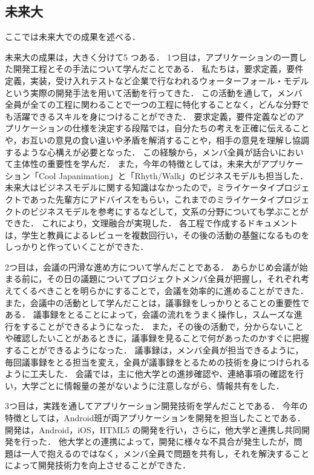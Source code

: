 \subsection{未来大}
\par
ここでは未来大での成果を述べる．
\par
未来大の成果は，大きく分けて5 つある．
1つ目は，アプリケーションの一貫した開発工程とその手法について学んだことである．
私たちは，要求定義，要件定義，実装，受け入れテストなど企業で行なわれるウォーターフォール・モデルという実際の開発手法を用いて活動を行ってきた．
この活動を通して，メンバ全員が全ての工程に関わることで一つの工程に特化することなく，どんな分野でも活躍できるスキルを身につけることができた．
要求定義，要件定義などのアプリケーションの仕様を決定する段階では，自分たちの考えを正確に伝えることや，お互いの意見の食い違いや矛盾を解消することや，相手の意見を理解し協調するような心構えが必要となった．
この経験から，メンバ全員が話合いにおいて主体性の重要性を学んだ．
また，今年の特徴としては，未来大がアプリケーション「Cool Japanimation」と「Rhyth/Walk」のビジネスモデルも担当した．
未来大はビジネスモデルに関する知識はなかったので，ミライケータイプロジェクトであった先輩方にアドバイスをもらい，これまでのミライケータイプロジェクトのビジネスモデルを参考にするなどして，文系の分野についても学ぶことができた．
これにより，文理融合が実現した．
各工程で作成するドキュメントは，学生と教員によるレビューを複数回行い，その後の活動の基盤になるものをしっかりと作っていくことができた．
\par
2つ目は，会議の円滑な進め方について学んだことである．
あらかじめ会議が始まる前に，その日の議題についてプロジェクトメンバ全員が把握し，それぞれ考えてくるべきことを明らかにすることで，会議を効率的に進めることができた．
また，会議中の活動として学んだことは，議事録をしっかりとることの重要性である．
議事録をとることによって，会議の流れをうまく操作し，スムーズな進行をすることができるようになった．
また，その後の活動で，分からないことや確認したいことがあるときに，議事録を見ることで何があったのかすぐに把握することができるようになった．
議事録は，メンバ全員が担当できるように，毎回議事録をとる担当を変え，全員が議事録をとるための技術を身につけられるように工夫した．
会議では，主に他大学との進捗確認や、連絡事項の確認を行い，大学ごとに情報量の差がないように注意しながら、情報共有をした．
\par
3つ目は，実践を通してアプリケーション開発技術を学んだことである．
今年の特徴としては，Android班が両アプリケーションを開発を担当したことである．
開発は，Android，iOS，HTML5 の開発を行い，さらに，他大学と連携し共同開発を行った．
他大学との連携によって，開発に様々な不具合が発生したが，問題は一人で抱えるのではなく，メンバ全員で問題を共有し，それを解決することによって開発技術力を向上させることができた．
